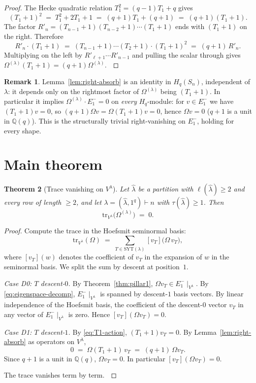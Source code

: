 \documentclass[11pt]{article}
\newtheorem{theorem}{Theorem}
\theoremstyle{definition}
\newtheorem{remark}[theorem]{Remark}
\newcommand{\Hq}{H_q}
\newcommand{\Sn}{S_n}
\newcommand{\Vlam}{V^{\lambda}}
\newcommand{\Om}{\Omega}
\newcommand{\hatl}{\widehat\lambda}
\newcommand{\elh}{\ell(\hatl)}
\newcommand{\Rp}{{R'}}
\newcommand{\SYT}{\mathrm{SYT}}
\newcommand{\tr}{\mathrm{tr}}
\begin{document}
\begin{proof}
The Hecke quadratic relation $T_1^2 = (q-1)T_1 + q$ gives
\[
   (T_1+1)^2 \;=\; T_1^2 + 2T_1 + 1
              \;=\; (q+1)T_1 + (q+1)
              \;=\; (q+1)(T_1+1).
\]
The factor $\Rp_n = (T_{n-1}+1)(T_{n-2}+1)\cdots(T_1+1)$ ends with
$(T_1+1)$ on the right.  Therefore
\[
   \Rp_n \cdot (T_1+1)
   \;=\; (T_{n-1}+1)\cdots(T_2+1)\cdot(T_1+1)^2
   \;=\; (q+1)\,\Rp_n.
\]
Multiplying on the left by $\Rp_{\ell+1}\cdots \Rp_{n-1}$ and pulling
the scalar through gives $\Om^{(\lambda)}(T_1+1) = (q+1)\Om^{(\lambda)}$. $\qedhere$
\end{proof}

\begin{remark}
Lemma~\ref{lem:right-absorb} is an identity in $\Hq(\Sn)$, independent
of $\lambda$: it depends only on the rightmost factor of $\Om^{(\lambda)}$
being $(T_1+1)$.  In particular it implies $\Om^{(\lambda)} \cdot E_1^-
= 0$ on \emph{every} $\Hq$-module: for $v \in E_1^-$ we have
$(T_1+1)v = 0$, so $(q+1)\Om v = \Om(T_1+1)v = 0$, hence $\Om v = 0$
($q+1$ is a unit in $\mathbb{Q}(q)$).  This is the structurally
trivial right-vanishing on $E_1^-$, holding for every shape.
\end{remark}

\section{Main theorem}\label{sec:main}

\begin{theorem}[Trace vanishing on $\Vlam$]\label{thm:main}
Let $\hatl$ be a partition with $\elh \ge 2$ and every row of length
$\ge 2$, and let $\lambda = (\hatl, 1^q) \vdash n$ with
$\tau(\hatl) \ge 1$.  Then
\[
   \tr_{\Vlam}\!\bigl(\Om^{(\lambda)}\bigr) \;=\; 0.
\]
\end{theorem}

\begin{proof}
Compute the trace in the Hoefsmit seminormal basis:
\[
   \tr_{\Vlam}(\Om) \;=\; \sum_{T \in \SYT(\lambda)} [v_T]\bigl(\Om\,v_T\bigr),
\]
where $[v_T](w)$ denotes the coefficient of $v_T$ in the expansion of
$w$ in the seminormal basis.  We split the sum by descent at
position~$1$.

\emph{Case D0: $T$ descent-$0$.}  By
Theorem~\ref{thm:pillar1}, $\Om v_T \in E_1^-\!\mid_{\Vlam}$.  By
\eqref{eq:eigenspace-decomp}, $E_1^-\!\mid_{\Vlam}$ is spanned by
descent-$1$ basis vectors.  By linear independence of the Hoefsmit
basis, the coefficient of the descent-$0$ vector $v_T$ in any vector
of $E_1^-\!\mid_{\Vlam}$ is zero.  Hence $[v_T](\Om v_T) = 0$.

\emph{Case D1: $T$ descent-$1$.}  By \eqref{eq:T1-action},
$(T_1+1)v_T = 0$.  By Lemma~\ref{lem:right-absorb} as operators on
$\Vlam$,
\[
   0 \;=\; \Om(T_1+1)\,v_T \;=\; (q+1)\,\Om v_T.
\]
Since $q+1$ is a unit in $\mathbb{Q}(q)$, $\Om v_T = 0$.  In
particular $[v_T](\Om v_T) = 0$.

The trace vanishes term by term. $\qedhere$
\end{proof}
\end{document}
